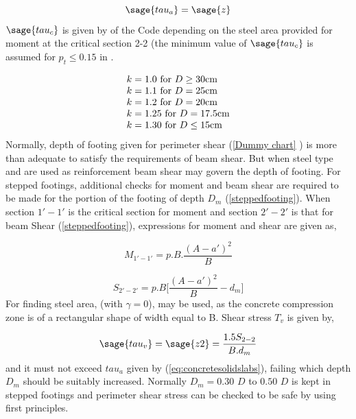 \begin{equation}
         \label{eq:concretesolidslabs}
        \sage{tau_a}=\sage{z}
\end{equation}
$\sage{tau_c}$ is given by  of the Code depending on the steel area provided for moment at the critical section 2-2 (the minimum value of $\sage{tau_c}$ is assumed for $p_t $$\leq$$ 0.15$ in .

$$\begin{array}{l@{}l}
&{}k=1.0 \text{ for } D \geq 30 \text{cm}\\
&{}k=1.1 \text{ for } D = 25 \text{cm}\\   
&{}k=1.2 \text{ for } D = 20 \text{cm}\\
&{}k=1.25 \text{ for } D = 17.5 \text{cm}\\   
&{}k=1.30 \text{ for } D \leq 15 \text{cm}  
\end{array}$$
Normally, depth of footing given for perimeter shear (\chartmacro \ref{Dummy chart} ) is more than adequate
to satisfy the requirements of beam shear. But when steel type  \Fefouronefivemacro and \Fefivezerozeromacro are used as reinforcement beam shear may govern the depth of footing. For stepped footings, additional checks for moment and beam shear are required to be made for the portion of the footing of depth $D_m$ (\figmacro \ref{steppedfooting}). When section ${1' - 1'}$ is the critical section for moment and section ${2' - 2'}$ is that for beam Shear (\figmacro \ref{steppedfooting}), expressions for moment and shear are given as,

\begin{equation}
         \label{eq:momentandshear1-1}
        M_{1'-1'}=p.B.\frac{(A-a')^2}{B}
\end{equation}

\begin{equation}                                             \label{eq:momentandshear2-2}
        S_{2'-2'}=p.B\bigg[\frac{(A-a')^2}{B}-d_m\bigg]                                 
\end{equation}
For finding steel area,  (with $\gamma = 0$), may be used, as the concrete compression zone is of a rectangular shape of width equal to B. Shear stress $T_v$ is given by,

\begin{equation}
        \label{eq:Shearstress}
        \sage{tau_v}=\sage{z2}=\frac{1.5S_{2-2}}{B.d_m}
\end{equation}
and it must not exceed ${tau_a}$ given by \equmacro (\ref{eq:concretesolidslabs}), failing which depth $D_m$ should be suitably increased.
Normally $D_m = 0.30$ $D$ to $0.50$ $D$ is kept in stepped footings and perimeter shear stress can be checked to be safe by using first principles.

